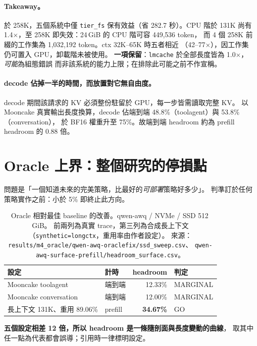 \documentclass[11pt]{article}
\newcommand{\key}[1]{\textcolor{hlcol}{\textbf{#1}}}
\begin{document}
\paragraph{Takeaway。}
於 258K，五個系統中僅 \texttt{tier\_fs} 保有效益（省 282.7 秒）。CPU 階於 131K 尚有
1.4$\times$，至 258K 即失效：24\,GiB 的 CPU 階可容 449{,}536 token，
而 4 個 258K 前綴的工作集為 1{,}032{,}192 token。ctx 32K–65K 時五者相近
（42–77$\times$），因工作集仍可置入 GPU，卸載階未被使用。
\textbf{一項保留}：\texttt{lmcache} 於全部長度皆為 1.0$\times$，\emph{可能}為組態錯誤
而非該系統的能力上限；在排除此可能之前不作宣稱。

\paragraph{decode 佔掉一半的時間，而放置對它無自由度。}
decode 期間該請求的 KV 必須整份駐留於 GPU，每一步皆需讀取完整 KV。
以 Mooncake 真實輸出長度換算，decode 佔端到端 48.8\%（toolagent）與 53.8\%（conversation），
於 BF16 權重升至 75\%。故端到端 headroom 約為 prefill headroom 的 0.88 倍。

\section{Oracle 上界：整個研究的停損點}

問題是「一個知道未來的完美策略，比最好的\emph{可部署}策略好多少」。
判準訂於任何策略實作之前：小於 5\% 即終止此方向。

\begin{table}[htbp]\centering\small
\caption{Oracle 相對最佳 baseline 的改善。qwen-awq / NVMe / SSD 512\,GiB。
前兩列為真實 trace，第三列為合成長上下文（\texttt{synthetic=longctx}，重用率由作者設定）。
來源：\texttt{results/m4\_oracle/qwen-awq-oraclefix/ssd\_sweep.csv}、
\texttt{qwen-awq-surface-prefill/headroom\_surface.csv}。}
\begin{tabular}{llrl}
\toprule
設定 & 計時 & headroom & 判定 \\
\midrule
Mooncake toolagent & 端到端 & 12.33\% & MARGINAL \\
Mooncake conversation & 端到端 & 12.00\% & MARGINAL \\
長上下文 131K、重用 89.06\% & prefill & \textbf{34.67\%} & GO \\
\bottomrule
\end{tabular}
\end{table}

\noindent\key{五個設定相差 12 倍，所以 headroom 是一條隨剖面與長度變動的曲線}，
取其中任一點為代表都會誤導；引用時一律標明設定。
\end{document}
